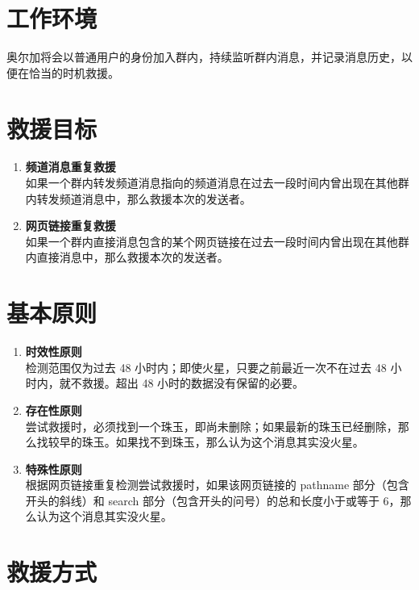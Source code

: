 \documentclass[a4paper,12pt]{article}
\begin{document}
    \section{工作环境}

    奥尔加将会以普通用户的身份加入群内，持续监听群内消息，并记录消息历史，以便在恰当的时机救援。

    \section{救援目标}

    \begin{enumerate}
        \item \textbf{频道消息重复救援}\\
            如果一个群内转发频道消息指向的频道消息在过去一段时间内曾出现在其他群内转发频道消息中，那么救援本次的发送者。
        \item \textbf{网页链接重复救援}\\
            如果一个群内直接消息包含的某个网页链接在过去一段时间内曾出现在其他群内直接消息中，那么救援本次的发送者。
    \end{enumerate}

    \section{基本原则}

    \begin{enumerate}
        \item \textbf{时效性原则}\\
            检测范围仅为过去 48 小时内；即使火星，只要之前最近一次不在过去 48 小时内，就不救援。超出 48 小时的数据没有保留的必要。
        \item \textbf{存在性原则}\\
            尝试救援时，必须找到一个珠玉，即尚未删除；如果最新的珠玉已经删除，那么找较早的珠玉。如果找不到珠玉，那么认为这个消息其实没火星。
        \item \textbf{特殊性原则}\\
            根据网页链接重复检测尝试救援时，如果该网页链接的 pathname 部分（包含开头的斜线）和 search 部分（包含开头的问号）的总和长度小于或等于 6，那么认为这个消息其实没火星。
    \end{enumerate}

    \section{救援方式}
\end{document}
